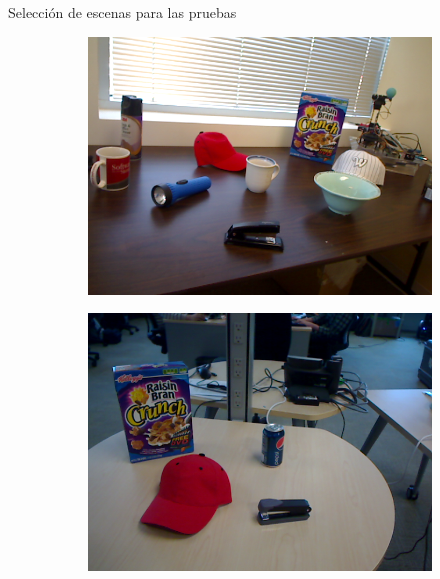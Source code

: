 \documentclass[]{beamer}
\begin{document}
\begin{frame}{Selección de escenas para las pruebas}
\begin{figure}
        \begin{subfigure}{0.45\textwidth}
            \centering
            \includegraphics[scale=0.2]{img/escenas/table_1.png}
        \end{subfigure}
        \begin{subfigure}{0.45\textwidth}
            \centering
            \includegraphics[scale=0.2]{img/escenas/table_small_2.png}
        \end{subfigure}
    \end{figure}
\end{frame}
\end{document}
